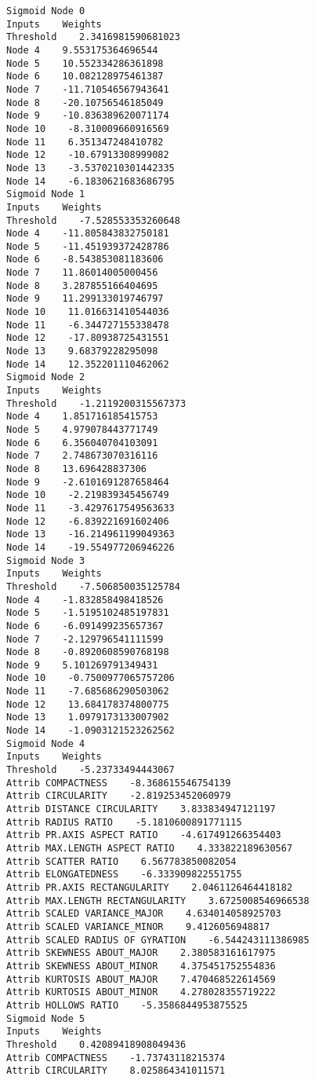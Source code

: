 \documentclass[
	article,			%
	11pt,				%
	oneside,			%
	a4paper,			%
	english,			%
	brazil,				%
	sumario=tradicional
	]{abntex2}
\begin{document}
\begin{lstlisting}
Sigmoid Node 0
Inputs    Weights
Threshold    2.3416981590681023
Node 4    9.553175364696544
Node 5    10.552334286361898
Node 6    10.082128975461387
Node 7    -11.710546567943641
Node 8    -20.10756546185049
Node 9    -10.836389620071174
Node 10    -8.310009660916569
Node 11    6.351347248410782
Node 12    -10.67913308999082
Node 13    -3.5370210301442335
Node 14    -6.1830621683686795
Sigmoid Node 1
Inputs    Weights
Threshold    -7.528553353260648
Node 4    -11.805843832750181
Node 5    -11.451939372428786
Node 6    -8.543853081183606
Node 7    11.86014005000456
Node 8    3.287855166404695
Node 9    11.299133019746797
Node 10    11.016631410544036
Node 11    -6.344727155338478
Node 12    -17.80938725431551
Node 13    9.68379228295098
Node 14    12.352201110462062
Sigmoid Node 2
Inputs    Weights
Threshold    -1.2119200315567373
Node 4    1.851716185415753
Node 5    4.979078443771749
Node 6    6.356040704103091
Node 7    2.748673070316116
Node 8    13.696428837306
Node 9    -2.6101691287658464
Node 10    -2.219839345456749
Node 11    -3.4297617549563633
Node 12    -6.839221691602406
Node 13    -16.214961199049363
Node 14    -19.554977206946226
Sigmoid Node 3
Inputs    Weights
Threshold    -7.506850035125784
Node 4    -1.832858498418526
Node 5    -1.5195102485197831
Node 6    -6.091499235657367
Node 7    -2.129796541111599
Node 8    -0.8920608590768198
Node 9    5.101269791349431
Node 10    -0.7500977065757206
Node 11    -7.685686290503062
Node 12    13.684178374800775
Node 13    1.0979173133007902
Node 14    -1.0903121523262562
Sigmoid Node 4
Inputs    Weights
Threshold    -5.23733494443067
Attrib COMPACTNESS    -8.368615546754139
Attrib CIRCULARITY    -2.819253452060979
Attrib DISTANCE CIRCULARITY    3.833834947121197
Attrib RADIUS RATIO    -5.1810600891771115
Attrib PR.AXIS ASPECT RATIO    -4.617491266354403
Attrib MAX.LENGTH ASPECT RATIO    4.333822189630567
Attrib SCATTER RATIO    6.567783850082054
Attrib ELONGATEDNESS    -6.333909822551755
Attrib PR.AXIS RECTANGULARITY    2.0461126464418182
Attrib MAX.LENGTH RECTANGULARITY    3.6725008546966538
Attrib SCALED VARIANCE_MAJOR    4.634014058925703
Attrib SCALED VARIANCE_MINOR    9.4126056948817
Attrib SCALED RADIUS OF GYRATION    -6.544243111386985
Attrib SKEWNESS ABOUT_MAJOR    2.380583161617975
Attrib SKEWNESS ABOUT_MINOR    4.375451752554836
Attrib KURTOSIS ABOUT_MAJOR    7.470468522614569
Attrib KURTOSIS ABOUT_MINOR    4.278028355719222
Attrib HOLLOWS RATIO    -5.3586844953875525
Sigmoid Node 5
Inputs    Weights
Threshold    0.42089418908049436
Attrib COMPACTNESS    -1.73743118215374
Attrib CIRCULARITY    8.025864341011571

\end{lstlisting}
\end{document}
